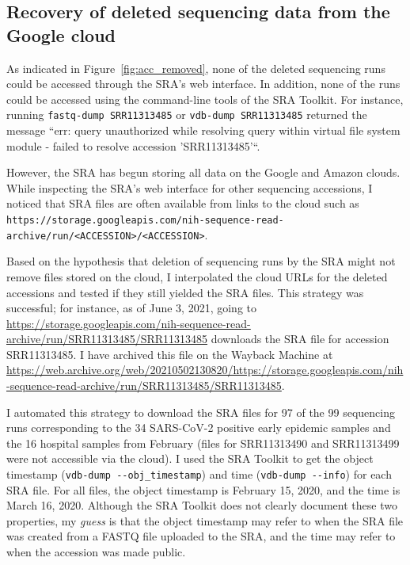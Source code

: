 \documentclass[9pt,twocolumn,twoside]{gsajnl_modified}
\begin{document}
\subsection{Recovery of deleted sequencing data from the Google cloud} 
As indicated in Figure~\ref{fig:acc_removed}, none of the deleted sequencing runs could be accessed through the SRA's web interface.
In addition, none of the runs could be accessed using the command-line tools of the SRA Toolkit.
For instance, running \texttt{fastq-dump SRR11313485} or \texttt{vdb-dump SRR11313485} returned the message ``err: query unauthorized while resolving query within virtual file system module - failed to resolve accession 'SRR11313485'``.

However, the SRA has begun storing all data on the Google and Amazon clouds.
While inspecting the SRA's web interface for other sequencing accessions, I noticed that SRA files are often available from links to the cloud such as \texttt{https://storage.googleapis.com/nih-sequence-read-archive/run/<ACCESSION>/<ACCESSION>}.

Based on the hypothesis that deletion of sequencing runs by the SRA might not remove files stored on the cloud, I interpolated the cloud URLs for the deleted accessions and tested if they still yielded the SRA files.
This strategy was successful; for instance, as of June 3, 2021, going to \url{https://storage.googleapis.com/nih-sequence-read-archive/run/SRR11313485/SRR11313485} downloads the SRA file for accession SRR11313485.
I have archived this file on the Wayback Machine at \url{https://web.archive.org/web/20210502130820/https://storage.googleapis.com/nih-sequence-read-archive/run/SRR11313485/SRR11313485}.

I automated this strategy to download the SRA files for 97 of the 99 sequencing runs corresponding to the 34 SARS-CoV-2 positive early epidemic samples and the 16 hospital samples from February (files for SRR11313490 and SRR11313499 were not accessible via the cloud).
I used the SRA Toolkit to get the object timestamp (\texttt{vdb-dump -{}-obj\_timestamp}) and time (\texttt{vdb-dump -{}-info}) for each SRA file.
For all files, the object timestamp is February 15, 2020, and the time is March 16, 2020.
Although the SRA Toolkit does not clearly document these two properties, my \emph{guess} is that the object timestamp may refer to when the SRA file was created from a FASTQ file uploaded to the SRA, and the time may refer to when the accession was made public.
\end{document}
